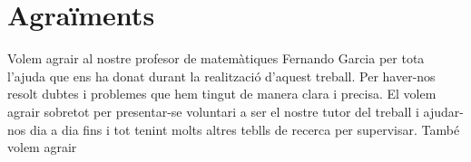 \chapter{Agraïments}
\label{c:Agraïments}

Volem agrair al nostre profesor de matemàtiques Fernando Garcia per tota l'ajuda que ens ha donat durant la realització d'aquest treball. Per haver-nos resolt dubtes i problemes que hem tingut de manera clara i precisa. El volem agrair sobretot per presentar-se voluntari a ser el nostre tutor del treball i ajudar-nos dia a dia fins i tot tenint molts altres teblls de recerca per supervisar.
També volem agrair
